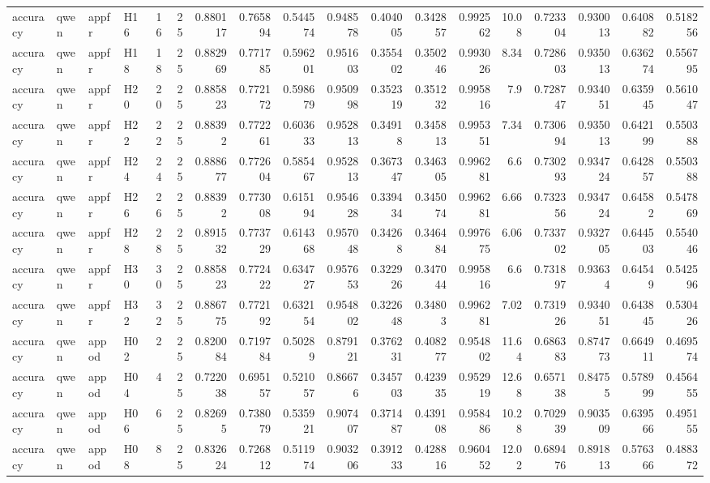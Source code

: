 \begin{longtable}{llllrrrrrrrrrrrrrr}
accuracy & qwen & appfr & H16 & 16 & 25 & 0.880117 & 0.765894 & 0.544574 & 0.948578 & 0.404005 & 0.342857 & 0.992562 & 10.08 & 0.723304 & 0.930013 & 0.640882 & 0.518256 \\
accuracy & qwen & appfr & H18 & 18 & 25 & 0.882969 & 0.771785 & 0.596201 & 0.951603 & 0.355402 & 0.350246 & 0.993026 & 8.34 & 0.728603 & 0.935013 & 0.636274 & 0.556795 \\
accuracy & qwen & appfr & H20 & 20 & 25 & 0.885823 & 0.772172 & 0.598679 & 0.950998 & 0.352319 & 0.351232 & 0.995816 & 7.9 & 0.728747 & 0.934051 & 0.635945 & 0.561047 \\
accuracy & qwen & appfr & H22 & 22 & 25 & 0.88392 & 0.772261 & 0.603633 & 0.952813 & 0.34918 & 0.345813 & 0.995351 & 7.34 & 0.730694 & 0.935013 & 0.642199 & 0.550388 \\
accuracy & qwen & appfr & H24 & 24 & 25 & 0.888677 & 0.772604 & 0.585467 & 0.952813 & 0.367347 & 0.346305 & 0.996281 & 6.6 & 0.730293 & 0.934724 & 0.642857 & 0.550388 \\
accuracy & qwen & appfr & H26 & 26 & 25 & 0.88392 & 0.773008 & 0.615194 & 0.954628 & 0.339434 & 0.345074 & 0.996281 & 6.66 & 0.732356 & 0.934724 & 0.64582 & 0.547869 \\
accuracy & qwen & appfr & H28 & 28 & 25 & 0.891532 & 0.773729 & 0.614368 & 0.957048 & 0.34268 & 0.346484 & 0.997675 & 6.06 & 0.733702 & 0.932705 & 0.644503 & 0.554046 \\
accuracy & qwen & appfr & H30 & 30 & 25 & 0.885823 & 0.772422 & 0.634727 & 0.957653 & 0.322926 & 0.347044 & 0.995816 & 6.6 & 0.731897 & 0.93634 & 0.64549 & 0.542596 \\
accuracy & qwen & appfr & H32 & 32 & 25 & 0.886775 & 0.772192 & 0.632154 & 0.954802 & 0.322648 & 0.34803 & 0.996281 & 7.02 & 0.731926 & 0.934051 & 0.643845 & 0.530426 \\
accuracy & qwen & appod & H02 & 2 & 25 & 0.820084 & 0.719784 & 0.50289 & 0.879121 & 0.376231 & 0.408277 & 0.954802 & 11.64 & 0.686383 & 0.874773 & 0.664911 & 0.469574 \\
accuracy & qwen & appod & H04 & 4 & 25 & 0.722038 & 0.695157 & 0.521057 & 0.86676 & 0.345703 & 0.423935 & 0.952919 & 12.68 & 0.657138 & 0.84755 & 0.578999 & 0.456455 \\
accuracy & qwen & appod & H06 & 6 & 25 & 0.82695 & 0.738079 & 0.535921 & 0.907407 & 0.371487 & 0.439108 & 0.958486 & 10.28 & 0.702939 & 0.903509 & 0.639566 & 0.495155 \\
accuracy & qwen & appod & H08 & 8 & 25 & 0.832624 & 0.726812 & 0.511974 & 0.903206 & 0.391233 & 0.428816 & 0.960452 & 12.02 & 0.689476 & 0.891813 & 0.576366 & 0.488372 \\

\end{longtable}
